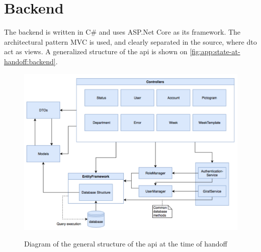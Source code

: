 \section{Backend}\label{app:state-at-handoff:backend}

The backend is written in C\# and uses ASP.Net Core as its framework. The architectural pattern MVC is used, and clearly separated in the source, where \gls{dto} act as views. A generalized structure of the \gls{api} is shown on \autoref{fig:app:state-at-handoff:backend}.

\begin{figure}[ht]
    \centering
    \caption{Diagram of the general structure of the \gls{api} at the time of handoff}
    \includegraphics[width=1\textwidth]{figures/api_gen_struct_ho.png}
    \label{fig:app:state-at-handoff:backend}
\end{figure}
